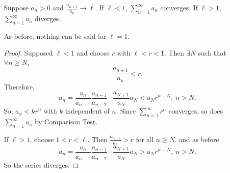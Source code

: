 \begin{theorem}
    Suppose \(a_n > 0\) and \(\frac{a_{n+1}}{a_n}\to \ell\). If \(\ell<1\), \(\sum\limits_{n=1}^{\infty} a_n\) converges. If \(\ell > 1\), \(\sum\limits_{n=1}^{\infty} a_n\) diverges.
\end{theorem}
\begin{remark}
    As before, nothing can be said for \(\ell = 1\).
\end{remark}
\begin{proof}
    Supposed \(\ell < 1\) and choose \(r\) with \(\ell < r < 1\). Then \(\exists N \) such that \(\forall n \geq N\),
    \[
        \frac{a_{n+1}}{a_n} < r.
    \]
    Therefore,
    \[
        a_n = \frac{a_n}{a_{n-1}}\frac{a_{n-1}}{a_{n-2}}\cdots \frac{a_{N+1}}{a_N}a_N<a_N r^{n-N},~n>N.
    \]
    So, \(a_n < kr^n\) with \(k\) independent of \(n\). Since \(\sum\limits_{n=1}^{\infty} r^n\) converges, so does \(\sum\limits_{n=1}^{\infty} a_n\) by Comparison Test.

    If \(\ell > 1\), choose \(1<r<\ell\). Then \(\frac{a_{n+1}}{a_n}>r\) for all \(n \geq N\), and as before
    \[
        a_n = \frac{a_n}{a_{n-1}}\frac{a_{n-1}}{a_{n-2}}\cdots \frac{a_{N+1}}{a_N}a_N>a_N r^{n-N},~n>N.
    \]
    So the series diverges.
\end{proof}